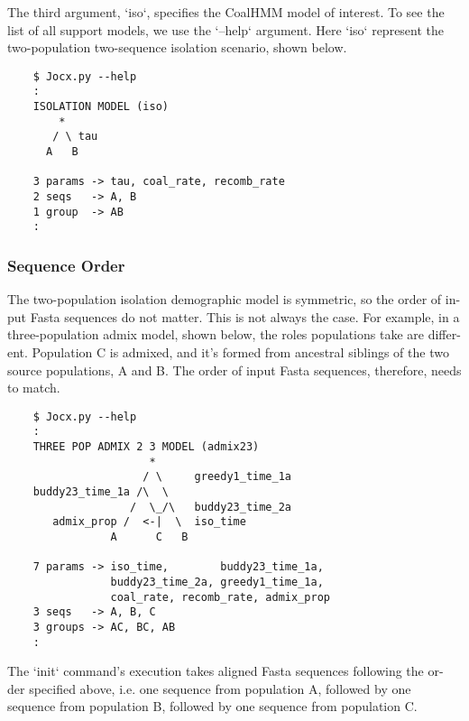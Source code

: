 The third argument, ‘iso‘, specifies the CoalHMM model of interest. To see the
list of all support models, we use the ‘–help‘ argument. Here ‘iso‘ represent
the two-population two-sequence isolation scenario, shown below.

{\small{}\begin{verbatim}
    $ Jocx.py --help
    :
    ISOLATION MODEL (iso)
        *
       / \ tau
      A   B

    3 params -> tau, coal_rate, recomb_rate
    2 seqs   -> A, B
    1 group  -> AB
    :
\end{verbatim}}

\subsubsection{Sequence Order}

The two-population isolation demographic model is symmetric, so the order of in-
put Fasta sequences do not matter. This is not always the case. For example, in
a three-population admix model, shown below, the roles populations take are
differ- ent. Population C is admixed, and it’s formed from ancestral siblings of
the two source populations, A and B. The order of input Fasta sequences,
therefore, needs to match.

{\small{}\begin{verbatim}
    $ Jocx.py --help
    :
    THREE POP ADMIX 2 3 MODEL (admix23)
                      *
                     / \     greedy1_time_1a
    buddy23_time_1a /\  \
                   /  \_/\   buddy23_time_2a
       admix_prop /  <-|  \  iso_time
                A      C   B

    7 params -> iso_time,        buddy23_time_1a,
                buddy23_time_2a, greedy1_time_1a,
                coal_rate, recomb_rate, admix_prop
    3 seqs   -> A, B, C
    3 groups -> AC, BC, AB
    :
\end{verbatim}}

The ‘init‘ command’s execution takes aligned Fasta sequences following the or-
der specified above, i.e. one sequence from population A, followed by one
sequence from population B, followed by one sequence from population C.

